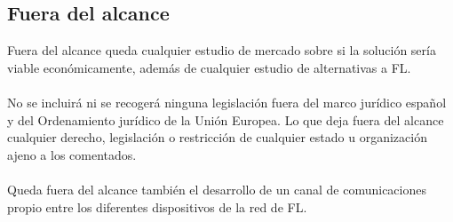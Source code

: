 \subsection{Fuera del alcance}
Fuera del alcance queda cualquier estudio de mercado sobre si la solución sería viable económicamente, además de cualquier estudio de alternativas a FL. 
\\ \\
No se incluirá ni se recogerá ninguna legislación fuera del marco jurídico español y del Ordenamiento jurídico de la Unión Europea. Lo que deja fuera del alcance cualquier derecho, legislación o restricción de cualquier estado u organización ajeno a los comentados.
\\ \\
Queda fuera del alcance también el desarrollo de un canal de comunicaciones propio entre los diferentes dispositivos de la red de FL.
